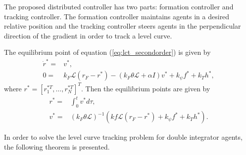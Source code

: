 The proposed distributed controller has two parts: formation controller and tracking controller. The formation controller maintains agents in a desired relative position and the tracking controller steers  agents in the perpendicular direction of the gradient in order to track a level curve.







The equilibrium point of equation (\ref{eq:lct_secondorder}) is given by
\small
\begin{align}\label{eq:lct_doubleinteqpoint}
\dot{r}^*=&v^*, \nonumber\\
0 = &k_F \mathcal{L}(r_F-r^*)-(k_F\theta \mathcal{L}+\alpha I)v^*+k_{\psi}f^*+k_Th^*,
\end{align}
\normalsize
where $r^*=[r_1^{*T},\ldots,r_N^{*T}]^T$. Then the equilibrium points are given by
\begin{align}
r^*=&\int_0^tv^*d\tau, \nonumber\\
v^*=&\left(k_F\theta\mathcal{L}\right)^{-1}\left(kf\mathcal{L}(r_F-r^*)+k_{\psi}f^*+k_Th^*\right).
\end{align}

In order to solve the level curve tracking problem for double integrator agents, the following theorem is presented.


